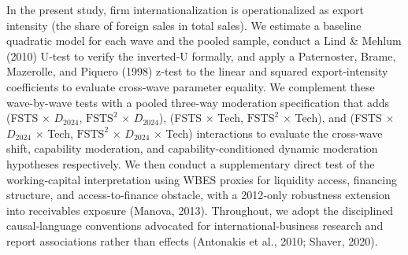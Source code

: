 \documentclass[12pt,a4paper]{article}
\begin{document}
In the present study, firm internationalization is operationalized as
export intensity (the share of foreign sales in total sales). We
estimate a baseline quadratic model for each wave and the pooled sample,
conduct a Lind \& Mehlum (2010) U‑test to verify the inverted‑U
formally, and apply a Paternoster, Brame, Mazerolle, and Piquero (1998)
z‑test to the linear and squared export‑intensity coefficients to
evaluate cross‑wave parameter equality. We complement these wave-by-wave
tests with a pooled three-way moderation specification that adds (FSTS
\(\times\) \(D_{2024}\), \(\mathrm{FSTS}^2\) \(\times\) \(D_{2024}\)),
(FSTS \(\times\) Tech, \(\mathrm{FSTS}^2\) \(\times\) Tech), and (FSTS
\(\times\) \(D_{2024}\) \(\times\) Tech, \(\mathrm{FSTS}^2\) \(\times\)
\(D_{2024}\) \(\times\) Tech) interactions to evaluate the cross-wave
shift, capability moderation, and capability-conditioned dynamic
moderation hypotheses respectively. We then conduct a supplementary
direct test of the working‑capital interpretation using WBES proxies for
liquidity access, financing structure, and access‑to‑finance obstacle,
with a 2012‑only robustness extension into receivables exposure (Manova,
2013). Throughout, we adopt the disciplined causal‑language conventions
advocated for international‑business research and report associations
rather than effects (Antonakis et al., 2010; Shaver, 2020).
\end{document}
